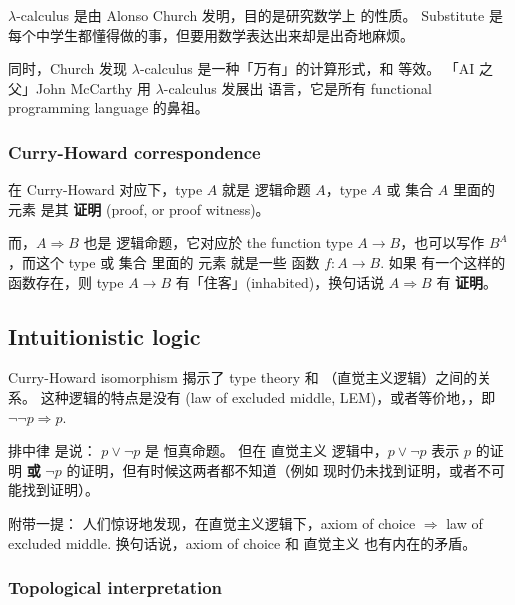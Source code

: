 $\lambda$-calculus 是由 Alonso Church 发明，目的是研究数学上  的性质。 Substitute 是每个中学生都懂得做的事，但要用数学表达出来却是出奇地麻烦。 

同时，Church 发现 $\lambda$-calculus 是一种「万有」的计算形式，和  等效。 「AI 之父」John McCarthy 用 $\lambda$-calculus 发展出  语言，它是所有 functional programming language 的鼻祖。 

\subsubsection{Curry-Howard correspondence}

在 Curry-Howard 对应下，type $A$ 就是 逻辑命题 $A$，type $A$ 或 集合 $A$ 里面的 元素 是其 \textbf{证明} (proof, or proof witness)。

而，$A \Rightarrow B$ 也是 逻辑命题，它对应於 the function type $A \rightarrow B$，也可以写作 $B^A$，而这个 type 或 集合 里面的 元素 就是一些 函数 $f: A \rightarrow B$.  如果 有一个这样的函数存在，则 type $A \rightarrow B$ 有「住客」(inhabited)，换句话说 $A \Rightarrow B$ 有 \textbf{证明}。 

\subsection{Intuitionistic logic}

Curry-Howard isomorphism 揭示了 type theory 和  （直觉主义逻辑）之间的关系。 这种逻辑的特点是没有  (law of excluded middle, LEM)，或者等价地，，即 $\neg \neg p \Rightarrow p$.

排中律 是说： $p \vee \neg p$ 是 恒真命题。 但在 直觉主义 逻辑中，$p \vee \neg p$ 表示 $p$ 的证明 \textbf{或} $\neg p$ 的证明，但有时候这两者都不知道（例如 现时仍未找到证明，或者不可能找到证明）。 

附带一提： 人们惊讶地发现，在直觉主义逻辑下，axiom of choice $\Rightarrow$ law of excluded middle.  换句话说，axiom of choice 和 直觉主义 也有内在的矛盾。 

\subsubsection{Topological interpretation}

